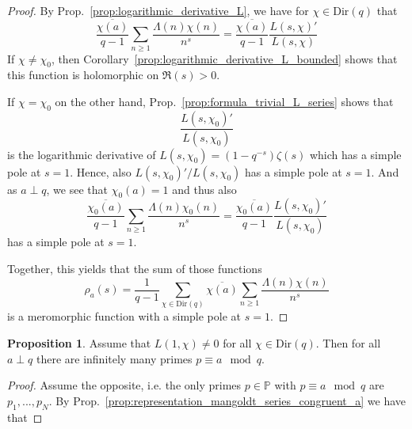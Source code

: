 \documentclass{scrartcl}
\newcommand{\primes}{\mathbb{P}}
\theoremstyle{definition}
\newtheorem{proposition}[definition]{Proposition}
\begin{document}
\begin{proof}
    By Prop.~\ref{prop:logarithmic_derivative_L}, we have for $\chi \in \mathrm{Dir}(q)$ that
    \begin{equation*}
        \frac {\overline{\chi(a)}} {q - 1} \sum_{n \geq 1} \frac {\Lambda(n) \chi(n)} {n^s} = \frac {\overline{\chi(a)}} {q - 1} \frac {L(s, \chi)'} {L(s, \chi)}
    \end{equation*}
    If $\chi \neq \chi_0$, then Corollary~\ref{prop:logarithmic_derivative_L_bounded} shows that this function is holomorphic on $\Re(s) > 0$.
    
    If $\chi = \chi_0$ on the other hand, Prop.~\ref{prop:formula_trivial_L_series} shows that
    \begin{equation*}
        \frac {L(s, \chi_0)'} {L(s, \chi_0)}
    \end{equation*}
    is the logarithmic derivative of $L(s, \chi_0) = (1 - q^{-s}) \zeta(s)$ which has a simple pole at $s = 1$.
    Hence, also $L(s, \chi_0)'/L(s, \chi_0)$ has a simple pole at $s = 1$.
    And as $a \perp q$, we see that $\chi_0(a) = 1$ and thus also
    \begin{equation*}
        \frac {\overline{\chi_0(a)}} {q - 1} \sum_{n \geq 1} \frac {\Lambda(n) \chi_0(n)} {n^s} = \frac {\overline{\chi_0(a)}} {q - 1} \frac {L(s, \chi_0)'} {L(s, \chi_0)}
    \end{equation*}
    has a simple pole at $s = 1$.

    Together, this yields that the sum of those functions
    \begin{equation*}
        \rho_a(s) = \frac 1 {q - 1} \sum_{\chi \in \mathrm{Dir}(q)} \overline{\chi(a)} \sum_{n \geq 1} \frac {\Lambda(n) \chi(n)} {n^s}
    \end{equation*}
    is a meromorphic function with a simple pole at $s = 1$.
\end{proof}
\begin{proposition}
    Assume that $L(1, \chi) \neq 0$ for all $\chi \in \mathrm{Dir}(q)$.
    Then for all $a \perp q$ there are infinitely many primes $p \equiv a \mod q$.
\end{proposition}
\begin{proof}
    Assume the opposite, i.e. the only primes $p \in \primes$ with $p \equiv a \mod q$ are $p_1, ..., p_N$.
    By Prop.~\ref{prop:representation_mangoldt_series_congruent_a} we have that

\end{proof}

\printbibliography
\end{document}
